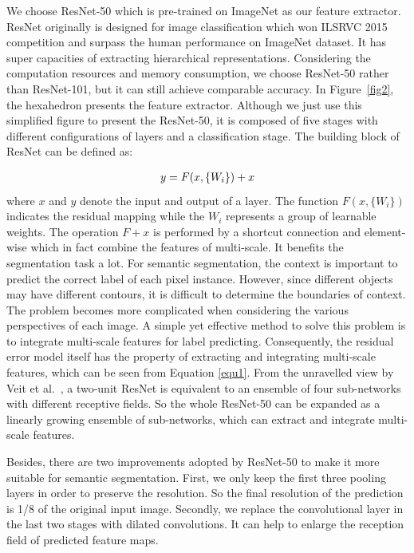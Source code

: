 \documentclass[10.5pt,compsoc]{TsT}
\newcommand{\upcite}[1]{\superscript{\textsuperscript{\cite{#1}}}}
\theoremstyle{mystyle}
\newcommand{\upcite}[1]{\textsuperscript{\cite{#1}}}
\begin{document}
{We choose ResNet-50 which is pre-trained on ImageNet as our feature extractor. ResNet originally is designed for image classification which won ILSRVC 2015 competition and surpass the human performance on ImageNet dataset. It has super capacities of extracting hierarchical representations. Considering the computation resources and memory consumption, we choose ResNet-50 rather than ResNet-101, but it can still achieve comparable accuracy. In Figure~\ref{fig2}, the hexahedron presents the feature extractor. Although we just use this simplified figure to present the ResNet-50, it is composed of five stages with different configurations of layers and a classification stage. The building block of ResNet can be defined as:

\begin{equation}\label{equ1}
\setlength\abovedisplayskip{4pt}
\setlength\belowdisplayskip{4pt}
\begin{split}
y = F(x, \{W_{i}\}) + x \\
\end{split}
\end{equation} 
where $x$ and $y$ denote the input and output of a layer. The function $F(x, \{W_{i}\})$ indicates the residual mapping while the $W_{i}$ represents a group of learnable weights. The operation $F + x$ is performed by a shortcut connection and element-wise which in fact combine the features of multi-scale. It benefits the segmentation task a lot. For semantic segmentation,  the context is important to predict the correct label of each pixel instance. However, since different objects may have different contours, it is difficult to determine the boundaries of context. The problem becomes more complicated when considering the various perspectives of each image. A simple yet effective method to solve this problem is to integrate multi-scale features for label predicting. Consequently, the residual error model itself has the property of extracting and integrating multi-scale features, which can be seen from Equation \ref {equ1}. From the unravelled view by Veit et al.~\upcite{22}, a two-unit ResNet is equivalent to an ensemble of four sub-networks with different receptive fields. So the whole ResNet-50 can be expanded as a linearly growing ensemble of sub-networks, which can extract and integrate multi-scale features.

Besides, there are two improvements adopted by ResNet-50 to make it more suitable for semantic segmentation. First, we only keep the first three pooling layers in order to preserve the resolution. So the final resolution of the prediction is 1/8 of the original input image. Secondly, we replace the convolutional layer in the last two stages with dilated convolutions. It can help to enlarge the reception field of predicted feature maps.



}
\end{document}
